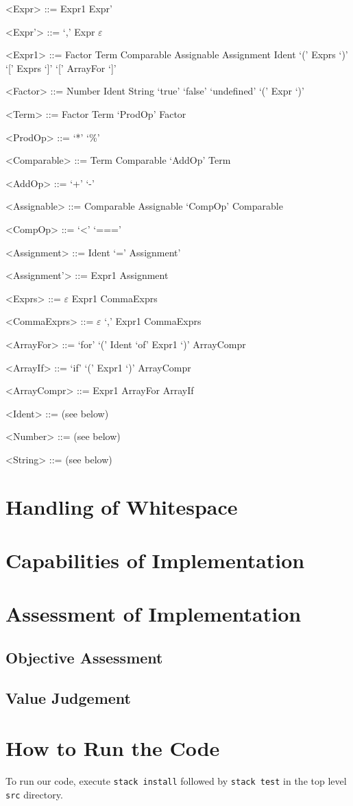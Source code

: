 \documentclass{article}
\begin{document}
\begin{grammar}
	\let\syntleft\relax
	\let\syntright\relax
	
	<Expr> ::= Expr1 Expr'
	
	<Expr'> ::= `,' Expr
	\alt $\varepsilon$

	<Expr1> ::= Factor
	\alt Term
	\alt Comparable
	\alt Assignable
	\alt Assignment
	\alt Ident `(' Exprs `)'
	\alt `[' Exprs `]'
	\alt `[' ArrayFor `]'
		
	<Factor> ::= Number
	\alt Ident
	\alt String
	\alt `true'
	\alt `false'
	\alt `undefined'
	\alt `(' Expr `)'
	
	<Term> ::= Factor
	\alt Term `ProdOp' Factor
	
	<ProdOp> ::= `*'
	\alt `\%'
	
	<Comparable> ::= Term
	\alt Comparable `AddOp' Term
	
	<AddOp> ::= `+'
	\alt `-'
	
	<Assignable> ::= Comparable
	\alt Assignable `CompOp' Comparable	
	
	<CompOp> ::= `<'
	\alt `==='
	
	<Assignment> ::= Ident `=' Assignment'
	
	<Assignment'> ::= Expr1
	\alt Assignment
	
	<Exprs> ::= $\varepsilon$
	\alt Expr1 CommaExprs	
	
	<CommaExprs> ::= $\varepsilon$
	\alt `,' Expr1 CommaExprs
	
	<ArrayFor> ::= `for' `(' Ident `of' Expr1 `)' ArrayCompr
	
	<ArrayIf> ::= `if' `(' Expr1 `)' ArrayCompr
	
	<ArrayCompr> ::= Expr1
	\alt ArrayFor
	\alt ArrayIf
	
	<Ident> ::= (see below)
	
	<Number> ::= (see below)
	
	<String> ::= (see below)
\end{grammar}


\section{Handling of Whitespace}


\section{Capabilities of Implementation}


\section{Assessment of Implementation}
\subsection{Objective Assessment}


\subsection{Value Judgement}


\section{How to Run the Code}
To run our code, execute \texttt{stack install} followed by \texttt{stack test} in the top level \texttt{src} directory.
\end{document}

